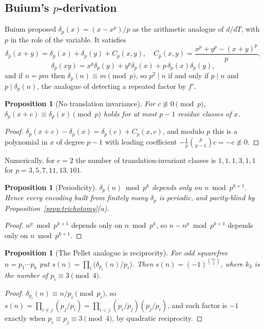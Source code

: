 \documentclass[11pt]{amsart}
\newtheorem{proposition}[theorem]{Proposition}
\theoremstyle{definition}
\theoremstyle{remark}
\begin{document}
\subsection{Buium's $p$-derivation}
Buium \cite{Bui97,Bui05} proposed $\delta_p(x)=(x-x^p)/p$ as the arithmetic analogue of $d/dT$, with $p$ in the role of the variable. It satisfies
\[
\delta_p(x+y)=\delta_p(x)+\delta_p(y)+C_p(x,y),\quad C_p(x,y)=\frac{x^p+y^p-(x+y)^p}{p},
\]
\[
\delta_p(xy)=x^p\delta_p(y)+y^p\delta_p(x)+p\,\delta_p(x)\delta_p(y),
\]
and if $n=pm$ then $\delta_p(n)\equiv m\pmod p$, so $p^2\mid n$ if and only if $p\mid n$ and $p\mid\delta_p(n)$, the analogue of detecting a repeated factor by $f'$.

\begin{proposition}[No translation invariance]\label{prop:buium-shift}
For $c\not\equiv0\pmod p$, $\delta_p(x+c)\equiv\delta_p(x)\pmod p$ holds for at most $p-1$ residue classes of $x$.
\end{proposition}

\begin{proof}
$\delta_p(x+c)-\delta_p(x)=\delta_p(c)+C_p(x,c)$, and modulo $p$ this is a polynomial in $x$ of degree $p-1$ with leading coefficient $-\frac1p\binom p{p-1}c=-c\not\equiv0$.
\end{proof}

Numerically, for $c=2$ the number of translation-invariant classes is $1,1,1,3,1,1$ for $p=3,5,7,11,13,101$.

\begin{proposition}[Periodicity]\label{prop:buium-period}
$\delta_p(n)\bmod p^k$ depends only on $n\bmod p^{k+1}$. Hence every encoding built from finitely many $\delta_p$ is periodic, and parity-blind by Proposition~\ref{prop:trichotomy}(a).
\end{proposition}

\begin{proof}
$n^p\bmod p^{k+1}$ depends only on $n\bmod p^k$, so $n-n^p\bmod p^{k+1}$ depends only on $n\bmod p^{k+1}$.
\end{proof}

\begin{proposition}[The Pellet analogue is reciprocity]\label{prop:buium-recip}
For odd squarefree $n=p_1\cdots p_k$ put $s(n)=\prod_i\bigl(\delta_{p_i}(n)/p_i\bigr)$. Then $s(n)=(-1)^{\binom{k_3}2}$, where $k_3$ is the number of $p_i\equiv3\pmod4$.
\end{proposition}

\begin{proof}
$\delta_{p_i}(n)\equiv n/p_i\pmod{p_i}$, so $s(n)=\prod_{i\ne j}(p_j/p_i)=\prod_{i<j}(p_i/p_j)(p_j/p_i)$, and each factor is $-1$ exactly when $p_i\equiv p_j\equiv3\pmod4$, by quadratic reciprocity.
\end{proof}
\end{document}
